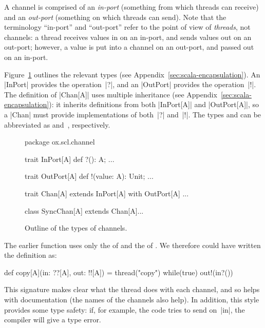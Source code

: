 
A channel is comprised of an \emph{in-port} (something from
which threads can receive) and an \emph{out-port} (something
on which threads can send).  Note that the terminology ``in-port'' and
``out-port'' refer to the point of view of \emph{threads}, not channels: a
thread receives values in on an in-port, and sends values out on an out-port;
however, a value is put into a channel on an out-port, and passed out on an
in-port.

Figure~\ref{fig:channel-types} outlines the relevant types (see
Appendix~\ref{sec:scala-encapsulation}).  An |InPort|
provides the operation~|?|, and an |OutPort|
provides the operation~|!|.  The definition of |Chan[A]| uses multiple
inheritance (see Appendix~\ref{sec:scala-encapsulation}): it inherits
definitions from both |InPort[A]| and |OutPort[A]|, so a |Chan| must provide
implementations of both~|?| and~|!|.  The types 
and  can be abbreviated as 
and~\SCALA{!![A]},
respectively.




\begin{figure}
\begin{scala}
package ox.scl.channel

trait InPort[A]{ def ?(): A; ... }
        
trait OutPort[A]{ def !(value: A): Unit; ... }
  
trait Chan[A] extends InPort[A] with OutPort[A]{ ... }

class SyncChan[A] extends Chan[A]{...} 
\end{scala}
\caption{Outline of the types of channels.}
\label{fig:channel-types}
\end{figure}


The earlier function  uses only the  of 
and the  of .  We therefore could have written the
definition as:
%
\begin{scala}
  def copy[A](in: ??[A], out: !![A]) = thread("copy"){ 
    while(true) out!(in?()) 
  }
\end{scala}
%
This signature makes clear what the thread does with each channel, and so
helps with documentation (the names of the channels also help).  In addition,
this style provides some  type safety: if, for example, the code tries to send
on~|in|, the compiler will give a type error. 

